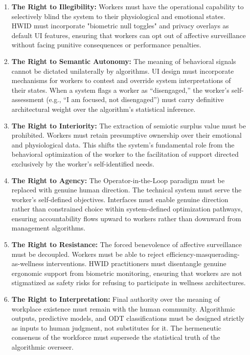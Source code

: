 \documentclass[11pt, a4paper]{article}
\begin{document}
\begin{enumerate}
    \item \textbf{The Right to Illegibility:} Workers must have the operational capability to selectively blind the system to their physiological and emotional states. HWID must incorporate "biometric null toggles" and privacy overlays as default UI features, ensuring that workers can opt out of affective surveillance without facing punitive consequences or performance penalties.
    \item \textbf{The Right to Semantic Autonomy:} The meaning of behavioral signals cannot be dictated unilaterally by algorithms. UI design must incorporate mechanisms for workers to contest and override system interpretations of their states. When a system flags a worker as ``disengaged,'' the worker's self-assessment (e.g., ``I am focused, not disengaged'') must carry definitive architectural weight over the algorithm's statistical inference.
    \item \textbf{The Right to Interiority:} The extraction of semiotic surplus value must be prohibited. Workers must retain presumptive ownership over their emotional and physiological data. This shifts the system's fundamental role from the behavioral optimization of the worker to the facilitation of support directed exclusively by the worker's self-identified needs.
    \item \textbf{The Right to Agency:} The Operator-in-the-Loop paradigm must be replaced with genuine human direction. The technical system must serve the worker's self-defined objectives. Interfaces must enable genuine direction rather than constrained choice within system-defined optimization pathways, ensuring accountability flows upward to workers rather than downward from management algorithms.
    \item \textbf{The Right to Resistance:} The forced benevolence of affective surveillance must be decoupled. Workers must be able to reject efficiency-masquerading-as-wellness interventions. HWID practitioners must disentangle genuine ergonomic support from biometric monitoring, ensuring that workers are not stigmatized as safety risks for refusing to participate in wellness architectures.
    \item \textbf{The Right to Interpretation:} Final authority over the meaning of workplace existence must remain with the human community. Algorithmic outputs, predictive models, and ODT classifications must be designed strictly as inputs to human judgment, not substitutes for it. The hermeneutic consensus of the workforce must supersede the statistical truth of the algorithmic overseer.
\end{enumerate}
\end{document}
